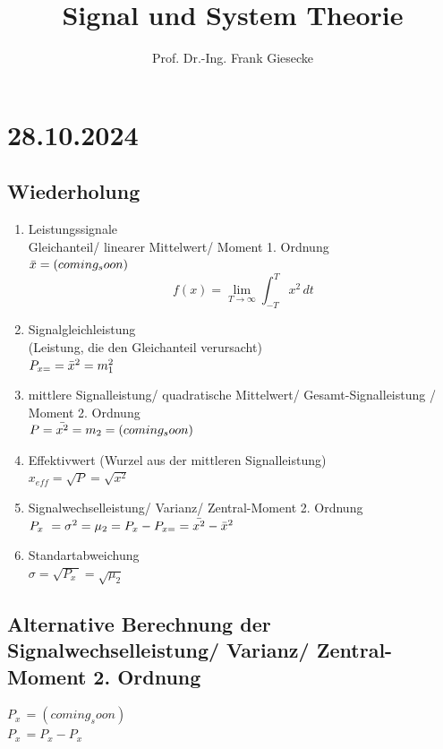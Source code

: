 \documentclass{article}
\title{Signal und System Theorie}
\author{Prof. Dr.-Ing. Frank Giesecke}
\date{}
\begin{document}
\maketitle

\section*{28.10.2024}

\subsection*{Wiederholung}

\begin{enumerate}
\item Leistungssignale \\
Gleichanteil/ linearer Mittelwert/ Moment 1. Ordnung \\
$\Bar{x} = (coming_soon)$
\[
    f(x) = \lim_{T\to\infty} \int_{-T}^{T} x^2 \,dt 
\]

\item Signalgleichleistung \\
(Leistung, die den Gleichanteil verursacht) \\
$P_{x=} = \Bar{x}^2 = m_1^2$

\item mittlere Signalleistung/ quadratische Mittelwert/ Gesamt-Signalleistung / Moment 2. Ordnung \\
$P = \Bar{x^2} = m_2 = (coming_soon)$

\item Effektivwert (Wurzel aus der mittleren Signalleistung) \\
$x_{eff}=\sqrt{P}=\sqrt{x^2}$

\item Signalwechselleistung/ Varianz/ Zentral-Moment 2. Ordnung \\
$P_{x~}=\sigma^2 = \mu_2 = P_x - P_{x=} = \Bar{x^2} - \Bar{x}^2$

\item Standartabweichung \\
$\sigma = \sqrt{P_{x~}} = \sqrt{\mu_2}$
\end{enumerate}

\subsection*{Alternative Berechnung der Signalwechselleistung/ Varianz/ Zentral-Moment 2. Ordnung}
$P_{x~} = (coming_soon)$ \\
$P_{x~} = P_x - P_x$
\end{document}
